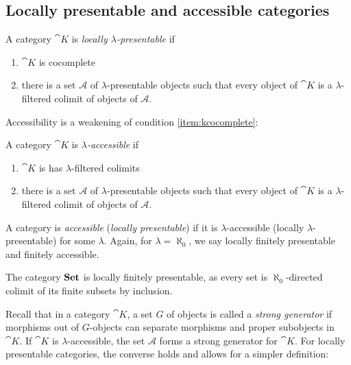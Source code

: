 \subsection{Locally presentable and accessible categories}

\begin{Definition}
A category $\cat K$ is \emph{locally $\lambda$-presentable} if
\begin{enumerate}
\item \label{item:kcocomplete} $\cat K$ is cocomplete
\item there is a set $\mathcal A$ of $\lambda$-presentable objects such that every object of $\cat K$ is a $\lambda$-filtered colimit of objects of $\mathcal A$.
\end{enumerate}
\end{Definition}

Accessibility is a weakening of condition \ref{item:kcocomplete}:

\begin{Definition}
A category $\cat K$ is \emph{$\lambda$-accessible} if
\begin{enumerate}
\item $\cat K$ is has $\lambda$-filtered colimits
\item there is a set $\mathcal A$ of $\lambda$-presentable objects such that every object of $\cat K$ is a $\lambda$-filtered colimit of objects of $\mathcal A$.
\end{enumerate}
\end{Definition}

A category is \emph{accessible} (\emph{locally presentable}) if it is $\lambda$-accessible (locally $\lambda$-presentable) for some $\lambda$. Again, for $\lambda = \aleph_0$, we say locally finitely presentable and finitely accessible. 

\begin{Example}
The category $\mathbf{Set}$ is locally finitely presentable, as every set is $\aleph_0$-directed colimit of its finite subsets by inclusion.
\end{Example}

Recall that in a category $\cat K$, a set $G$ of objects is called a \emph{strong generator} if morphisms out of $G$-objects can separate morphisms and proper subobjects in $\cat K$. If $\cat K$ is $\lambda$-accessible, the set $\mathcal A$ forms a strong generator for $\cat K$. For locally presentable categories, the converse holds and allows for a simpler definition:

